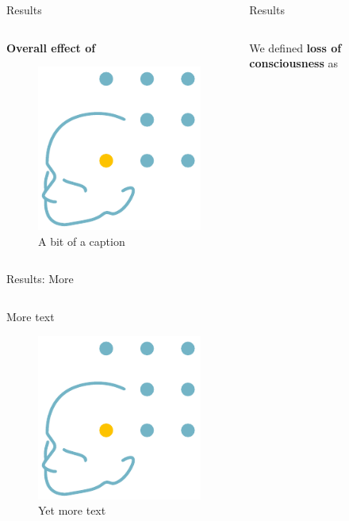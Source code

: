 \documentclass{beamer}
\renewcommand{\emph}{\textbf}
\newenvironment{wideitemize}{\itemize\addtolength{\itemsep}{.2em}\addtolength{\labelsep}{.1ex}}{\enditemize}
\begin{document}
\begin{frame}[t]
\begin{columns}[T]
\begin{column}{.32\linewidth}
\begin{block}{Results}
\begin{columns}[T]
\begin{column}{.95\linewidth}
\emph{Overall effect of}
\begin{wideitemize}
\item 
\end{wideitemize}
\begin{figure}
\label{fig:proptimecourse}
\begin{center}
\includegraphics[width=.2\linewidth]{../figures/logo-epi.png}
\end{center}
\caption{A bit of a caption}
\end{figure}
\end{column}
\end{columns}
\end{block}
\begin{block}{Results: More}
\begin{columns}
\begin{column}{.95\linewidth}
More text

\begin{figure}
\label{fig:severalunits}
\begin{center}
  \includegraphics[width=.2\linewidth]{../figures/logo-epi.png}
\end{center}
\caption{Yet more text}
\end{figure}
\end{column}
\end{columns}
\end{block}


\end{column}

\begin{column}{.32\linewidth}
\begin{block}{Results}
\begin{columns}[T]
\begin{column}{.95\linewidth}
\begin{wideitemize}
\item We defined \emph{loss of consciousness} as
\item 
\item 
\item 


\end{wideitemize}
\end{column}
\end{columns}
\end{block}
\end{column}
\end{columns}
\end{frame}
\end{document}
